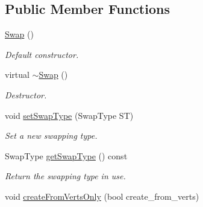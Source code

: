 \subsection*{Public Member Functions}
\begin{DoxyCompactItemize}
\item 
\hyperlink{class_i_t_a_p_s___swap_1_1_swap_a169ddddc93fdbddcca76a78e6df090d2}{Swap} ()
\begin{DoxyCompactList}\small\item\em Default constructor. \item\end{DoxyCompactList}\item 
\hypertarget{class_i_t_a_p_s___swap_1_1_swap_a081ac4a0a18d8d814c86dbe6092ee48d}{
virtual \hyperlink{class_i_t_a_p_s___swap_1_1_swap_a081ac4a0a18d8d814c86dbe6092ee48d}{$\sim$Swap} ()}
\label{class_i_t_a_p_s___swap_1_1_swap_a081ac4a0a18d8d814c86dbe6092ee48d}

\begin{DoxyCompactList}\small\item\em Destructor. \item\end{DoxyCompactList}\item 
void \hyperlink{class_i_t_a_p_s___swap_1_1_swap_a1cfc31d486bf82d7481ce87caec66853}{setSwapType} (SwapType ST)
\begin{DoxyCompactList}\small\item\em Set a new swapping type. \item\end{DoxyCompactList}\item 
\hypertarget{class_i_t_a_p_s___swap_1_1_swap_a5b46657be10052f7546b320d8abef42c}{
SwapType \hyperlink{class_i_t_a_p_s___swap_1_1_swap_a5b46657be10052f7546b320d8abef42c}{getSwapType} () const }
\label{class_i_t_a_p_s___swap_1_1_swap_a5b46657be10052f7546b320d8abef42c}

\begin{DoxyCompactList}\small\item\em Return the swapping type in use. \item\end{DoxyCompactList}\item 
\hypertarget{class_i_t_a_p_s___swap_1_1_swap_a4bca0bc9501a09e69d629aaa7c57a3d7}{
void \hyperlink{class_i_t_a_p_s___swap_1_1_swap_a4bca0bc9501a09e69d629aaa7c57a3d7}{createFromVertsOnly} (bool create\_\-from\_\-verts)}
\label{class_i_t_a_p_s___swap_1_1_swap_a4bca0bc9501a09e69d629aaa7c57a3d7}


\end{DoxyCompactItemize}
